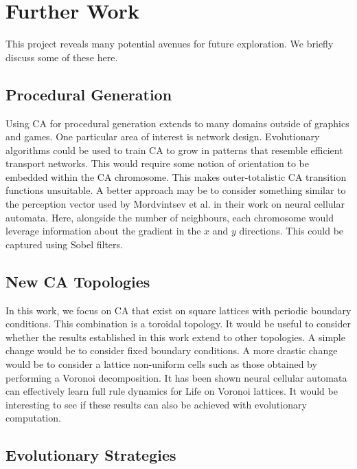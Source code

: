 \section{Further Work}

This project reveals many potential avenues for future exploration. We briefly discuss some of these here.

\subsection{Procedural Generation}

Using CA for procedural generation extends to many domains outside of graphics and games. One particular area of interest is network design. Evolutionary algorithms could be used to train CA to grow in patterns that resemble efficient transport networks. This would require some notion of orientation to be embedded within the CA chromosome. This makes outer-totalistic CA transition functions unsuitable. A better approach may be to consider something similar to the perception vector used by Mordvintsev et al.\cite{mordvintsev2020growing} in their work on neural cellular automata. Here, alongside the number of neighbours, each chromosome would leverage information about the gradient in the $x$ and $y$ directions. This could be captured using Sobel filters.

\subsection{New CA Topologies}

In this work, we focus on CA that exist on square lattices with periodic boundary conditions. This combination is a toroidal topology. It would be useful to consider whether the results established in this work extend to other topologies. A simple change would be to consider fixed boundary conditions. A more drastic change would be to consider a lattice non-uniform cells such as those obtained by performing a Voronoi decomposition. It has been shown neural cellular automata can effectively learn full rule dynamics for Life on Voronoi lattices\cite{grattarola2021learning}. It would be interesting to see if these results can also be achieved with evolutionary computation.

\subsection{Evolutionary Strategies}

